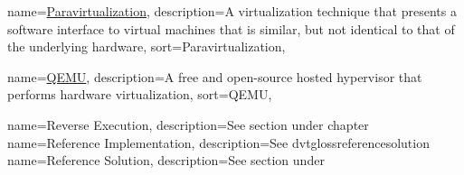 \newcommand{\dvttermnasa}{NASA}
\newcommand{\dvttermnortel}{Nortel Networks Corporation}
\newcommand{\dvttermnorthropgrumman}{Northrop Grumman Corporation}

\newcommand{\dvttermopengl}{OpenGL}
\newcommand{\dvttermopengles}{\dvttermopengl ~ES}
\newcommand{\dvttermopenglestwopointo}{\dvttermopengles ~\dvtcmdnum{2.0}}
\newcommand{\dvttermos}{\dvtcmdabbrev{dvtglossos}}

\newcommand{\dvttermpci}{\dvtcmdabbrev{dvtglosspci}}
\newcommand{\dvttermpcipassthrough}{\dvttermpci\ passthrough}
{
  name=\href{http://en.wikipedia.org/wiki/Paravirtualization}{Paravirtualization},
  description={A virtualization technique that presents a software interface to virtual machines that is similar, but not identical to that of the underlying hardware},
  sort={Paravirtualization},
}
\newcommand{\dvttermparavirtualization}{\dvtcmdcaponcegloss{dvtglossparavirtualization}{Paravirtualization}}
\newcommand{\dvttermpython}{\texttt{Python}}

{
  name=\href{http://en.wikipedia.org/wiki/QEMU}{QEMU},
  description={A free and open-source hosted hypervisor that performs hardware virtualization},
  sort={QEMU},
}
\newcommand{\dvttermqemu}{\glslink{dvtglossqemu}{QEMU}} %

{
  name=Reverse Execution,
  description={See section  under chapter }
}
\newcommand{\dvttermreverseexecution}{\dvtcmdcaponcegloss{dvtglossreverseexecution}{Reverse Execution}}
{
  name=Reference Implementation,
  description={See \gls{dvtglossreferencesolution}}
}
\newcommand{\dvttermreferenceimplementation}{\dvtcmdcaponcegloss{dvtglossreferenceimplementation}{Reference Implementation}}
{
  name=Reference Solution,
  description={See section  under }
}
\newcommand{\dvttermreferencesolution}{\dvtcmdcaponcegloss{dvtglossreferencesolution}{Reference Solution}}

